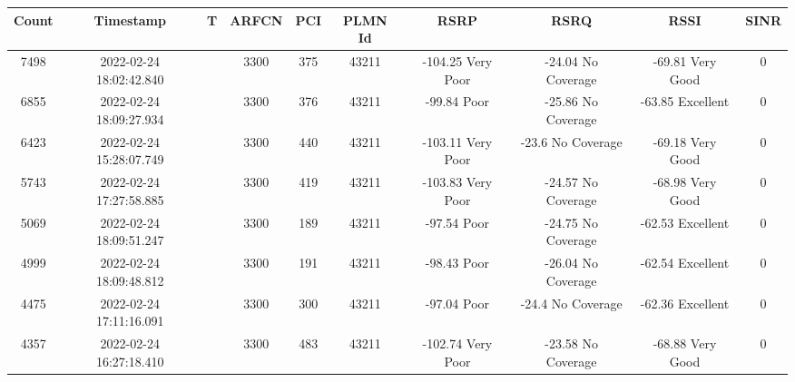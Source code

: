 \begin{longtable*}{|c|c|c|c|c|c|c|c|c|c|}\hline
{}
Count&Timestamp&T&ARFCN&PCI&PLMN Id&RSRP&RSRQ&RSSI&SINR\\\hline\hline
{}7498&2022-02-24 18:02:42.840&&3300&375&43211& -104.25   Very Poor   & -24.04    No Coverage & -69.81    Very Good   & 0\\\hline
{}6855&2022-02-24 18:09:27.934&&3300&376&43211& -99.84    Poor        & -25.86    No Coverage & -63.85    Excellent   & 0\\\hline
{}6423&2022-02-24 15:28:07.749&&3300&440&43211& -103.11   Very Poor   & -23.6     No Coverage & -69.18    Very Good   & 0\\\hline
{}5743&2022-02-24 17:27:58.885&&3300&419&43211& -103.83   Very Poor   & -24.57    No Coverage & -68.98    Very Good   & 0\\\hline
{}5069&2022-02-24 18:09:51.247&&3300&189&43211& -97.54    Poor        & -24.75    No Coverage & -62.53    Excellent   & 0\\\hline
{}4999&2022-02-24 18:09:48.812&&3300&191&43211& -98.43    Poor        & -26.04    No Coverage & -62.54    Excellent   & 0\\\hline
{}4475&2022-02-24 17:11:16.091&&3300&300&43211& -97.04    Poor        & -24.4     No Coverage & -62.36    Excellent   & 0\\\hline
{}4357&2022-02-24 16:27:18.410&&3300&483&43211& -102.74   Very Poor   & -23.58    No Coverage & -68.88    Very Good   & 0\\\hline

\end{longtable*}
